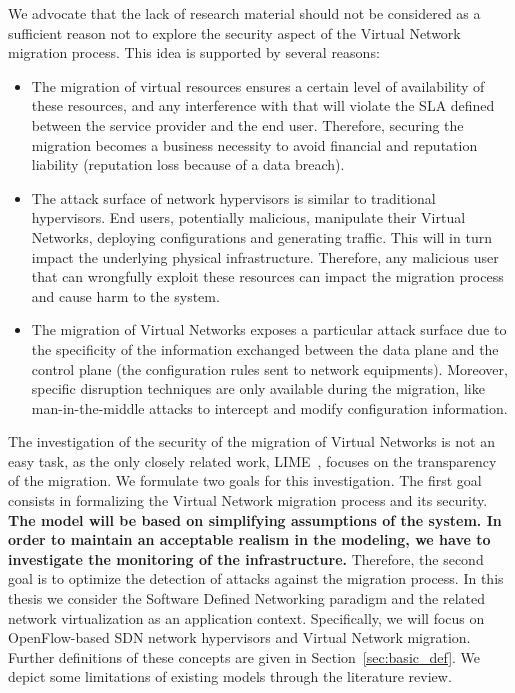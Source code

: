 We advocate that the lack of research material should not be considered as a sufficient reason not to explore the security aspect of the Virtual Network migration process. This idea is supported by several reasons:

\begin{itemize}
    
    \item The migration of virtual resources ensures a certain level of availability of these resources, and any interference with that will violate the SLA defined between the service provider and the end user.
    Therefore, securing the migration becomes a business necessity to avoid financial and reputation liability (\eg reputation loss because of a data breach).
    
    \item The attack surface of network hypervisors is similar to traditional hypervisors. End users, potentially malicious, manipulate their Virtual Networks, deploying configurations and generating traffic. This will in turn impact the underlying physical infrastructure. Therefore, any malicious user that can wrongfully exploit these resources can impact the migration process and cause harm to the system.

    \item The migration of Virtual Networks exposes a particular attack surface due to the specificity of the information exchanged between the data plane and the control plane (\eg the configuration rules sent to network equipments). Moreover, specific disruption techniques are only available during the migration, like man-in-the-middle attacks to intercept and modify configuration information.  
\end{itemize}

The investigation of the security of the migration of Virtual Networks is not an easy task, as the only closely related work, LIME~\cite{Lime-Ghorbani2014}, focuses on the transparency of the migration. 
We formulate two goals for this investigation.
The first goal consists in formalizing the Virtual Network migration process and its security.
\textbf{The model will be based on simplifying assumptions of the system. In order to maintain an acceptable realism in the modeling, we have to investigate the monitoring of the infrastructure.} 
Therefore, the second goal is to optimize the detection of attacks against the migration process. In this thesis we consider the Software Defined Networking paradigm and the related network virtualization as an application context. Specifically, we will focus on OpenFlow-based SDN network hypervisors and Virtual Network migration. Further definitions of these concepts are given in Section~\ref{sec:basic_def}. 
We depict some limitations of existing models through the literature review.


